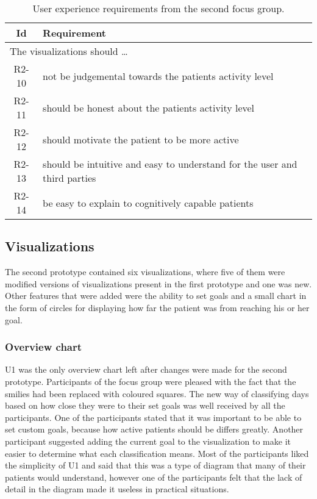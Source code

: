 \begin{table}[h!]
  \begin{center}
  \begin{tabular}{|c|p{12cm}|}
    \hline
      \textbf{Id} & \textbf{Requirement} \\ \hline
    \multicolumn{2}{|l|}{The visualizations should \ldots} \\ \hline
      R2-10 & not be judgemental towards the patients activity level \\ \hline
      R2-11 & should be honest about the patients activity level \\ \hline
      R2-12 & should motivate the patient to be more active \\ \hline
      R2-13 & should be intuitive and easy to understand for the user and third parties \\ \hline
      R2-14 & be easy to explain to cognitively capable patients \\ \hline
  \end{tabular}
  \end{center}
  \caption{User experience requirements from the second focus group.}
  \label{uxReqFoc2}
\end{table}

\subsection{Visualizations}
The second prototype contained six visualizations, where five of them were modified versions of visualizations present in the first prototype and one was new. Other features that were added were the ability to set goals and a small chart in the form of circles for displaying how far the patient was from reaching his or her goal.

\subsubsection{Overview chart}
U1 was the only overview chart left after changes were made for the second prototype. Participants of the focus group were pleased with the fact that the smilies had been replaced with coloured squares. The new way of classifying days based on how close they were to their set goals was well received by all the participants. One of the participants stated that it was important to be able to set custom goals, because how active patients should be differs greatly. Another participant suggested adding the current goal to the visualization to make it easier to determine what each classification means. Most of the participants liked the simplicity of U1 and said that this was a type of diagram that many of their patients would understand, however one of the participants felt that the lack of detail in the diagram made it useless in practical situations.

